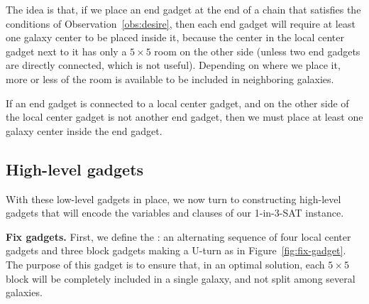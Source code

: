 The idea is that, if we place an end gadget at the end of a chain that satisfies the conditions of Observation~\ref {obs:desire}, then each end gadget will require at least one galaxy center to be placed inside it, because the center in the local center gadget next to it has only a $5 \times 5$ room on the other side (unless two end gadgets are directly connected, which is not useful). Depending on where we place it, more or less of the room is available to be included in neighboring galaxies.

\begin {observation} \label {obs:end}
  If an end gadget is connected to a local center gadget, and on the other side of the local center gadget is not another end gadget, then we must place at least one galaxy center inside the end gadget.
\end {observation}

\subsection {High-level gadgets}

With these low-level gadgets in place, we now turn to constructing high-level gadgets that will encode the variables and clauses of our 1-in-3-SAT instance.

\textbf{Fix gadgets.}
First, we define the : an alternating sequence of four local center gadgets and three block gadgets making a U-turn as in Figure~\ref {fig:fix-gadget}.
The purpose of this gadget is to ensure that, in an optimal solution, each $5\times5$ block will be completely included in a single galaxy, and not split among several galaxies.

